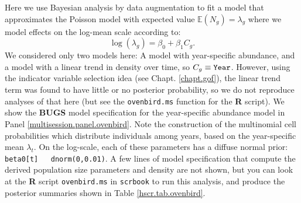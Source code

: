 Here we use Bayesian analysis by data augmentation to fit a model that
approximates the Poisson model with expected value $\mathbb{E}(N_{g})
= \lambda_{g}$ where we model effects on the log-mean scale according
to:
\[
\log( \lambda_{g} ) = \beta_{0} + \beta_{1} C_{g}.
\]
We considered only two models here: A model with year-specific
abundance, and a model with a linear trend in density over time, so
$C_{g} \equiv \mbox{\tt Year}$. However, using the
\citet{kuo_mallick:1998} indicator variable selection idea (see
Chapt. \ref{chapt.gof}), the linear trend term was found to have
little or no posterior probability, so we do not reproduce analyses of
that here (but see the \mbox{\tt ovenbird.ms} function for the {\bf R}
script).  We show the {\bf BUGS} model specification for the
year-specific abundance model in Panel
\ref{multisession.panel.ovenbird}. Note the construction of the
multinomial cell probabilities which distribute individuals among
years, based on the year-specific mean $\lambda_{t}$. On the
log-scale, each of these parameters has a diffuse normal prior:
\mbox{\tt beta0[t] ~ dnorm(0,0.01)}. A few lines of model
specification that compute the derived population size parameters and
density are not shown, but you can look at the {\bf R} script
\mbox{\tt ovenbird.ms} in \mbox{\tt scrbook} to run this analysis, and
produce the posterior summaries shown in Table
\ref{hscr.tab.ovenbird}.


